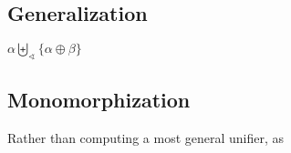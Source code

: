 \documentclass{article}
\begin{document}
\subsection{Generalization}

$\alpha \biguplus_\sphericalangle \{\alpha \oplus \beta\}$

\subsection{Monomorphization}

Rather than computing a most general unifier, as

\end{document}
